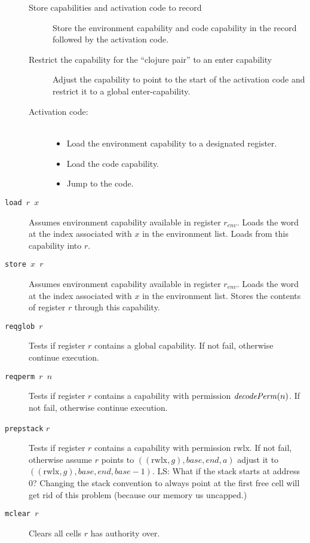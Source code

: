 \documentclass[a4paper]{article}
\newcommand{\forcenewline}{$\phantom{v}$\\}
\newcommand\lau[1]{{\color{purple} \sf \footnotesize {LS: #1}}\\}
\newcommand{\var}[1]{\mathit{#1}}
\newcommand{\gl}{\var{g}}
\newcommand{\addr}{\var{a}}
\newcommand{\start}{\var{base}}
\newcommand{\addrend}{\var{end}}
\newcommand{\plainfun}[2]{
  \ifthenelse{\equal{#2}{}}
  {\mathit{#1}}
  {\mathit{#1}(#2)}
}
\newcommand{\decodePerm}[1]{\plainfun{decodePerm}{#1}}
\newcommand{\plainperm}[1]{\mathrm{#1}}
\newcommand{\rwlx}{\plainperm{rwlx}}
\newcommand{\glob}{\plainperm{global}}
\begin{document}
\begin{description}
\begin{description}
                \item[Store capabilities and activation code to record] Store the environment capability and code capability in the record followed by the activation code. 
                \item[Restrict the capability for the ``clojure pair'' to an enter capability] Adjust the capability to point to the start of the activation code and restrict it to a global enter-capability.
                \item[Activation code:] \forcenewline
                  \begin{itemize}
                  \item Load the environment capability to a designated register.
                  \item Load the code capability.
                  \item Jump to the code.
                  \end{itemize}
                \end{description}
              \item[\texttt{load $r$ $x$}] Assumes environment capability available in register $r_{\var{env}}$. Loads the word at the index associated with $x$ in the environment list. Loads from this capability into $r$.
              \item[\texttt{store $x$ $r$}] Assumes environment capability available in register $r_{\var{env}}$. Loads the word at the index associated with $x$ in the environment list. Stores the contents of register $r$ through this capability.
              \item[\texttt{reqglob $r$}] Tests if register $r$ contains a $\glob$ capability. If not fail, otherwise continue execution.
              \item[\texttt{reqperm $r$ $n$}] Tests if register $r$ contains a capability with permission $\decodePerm{n}$. If not fail, otherwise continue execution.
              \item[\texttt{prepstack} $r$] Tests if register $r$ contains a capability with permission $\rwlx$. If not fail, otherwise assume $r$ points to $((\rwlx,\gl),\start,\addrend,\addr)$ adjust it to $((\rwlx,\gl),\start,\addrend,\start - 1)$. 
                \lau{What if the stack starts at address 0? Changing the stack convention to always point at the first free cell will get rid of this problem (because our memory us uncapped.)}
              \item[\texttt{mclear $r$}] Clears all cells $r$ has authority over. 
              \end{description}
\end{document}
